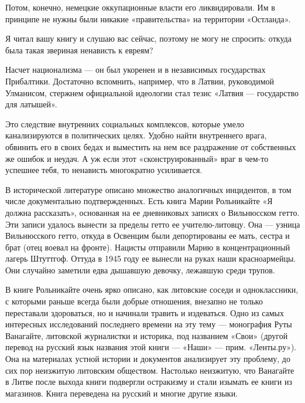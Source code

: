 Потом, конечно, немецкие оккупационные власти его ликвидировали. Им в принципе
не нужны были никакие «правительства» на территории «Остланда».

Я читал вашу книгу и слушаю вас сейчас, поэтому не могу не спросить: откуда
была такая звериная ненависть к евреям?

Насчет национализма — он был укоренен и в независимых государствах Прибалтики.
Достаточно вспомнить, например, что в Латвии, руководимой Улманисом, стержнем
официальной идеологии стал тезис «Латвия — государство для латышей».

Это следствие внутренних социальных комплексов, которые умело канализируются в
политических целях. Удобно найти внутреннего врага, обвинить его в своих бедах
и выместить на нем все раздражение от собственных же ошибок и неудач. А уж если
этот «сконструированный» враг в чем-то успешнее тебя, то ненависть многократно
усиливается.

В исторической литературе описано множество аналогичных инцидентов, в том числе
документально подтвержденных. Есть книга Марии Рольникайте «Я должна
рассказать», основанная на ее дневниковых записях о Вильнюсском гетто. Эти
записи удалось вынести за пределы гетто ее учителю-литовцу. Она — узница
Вильнюсского гетто, откуда в Освенцим были депортированы ее мать, сестра и брат
(отец воевал на фронте). Нацисты отправили Марию в концентрационный лагерь
Штуттгоф. Оттуда в 1945 году ее вынесли на руках наши красноармейцы. Они
случайно заметили едва дышавшую девочку, лежавшую среди трупов.

В книге Рольникайте очень ярко описано, как литовские соседи и одноклассники, с
которыми раньше всегда были добрые отношения, внезапно не только переставали
здороваться, но и начинали травить и издеваться. Одно из самых интересных
исследований последнего времени на эту тему — монография Руты Ванагайте,
литовской журналистки и историка, под названием «Свои» (другой перевод на
русский язык названия этой книги — «Наши» — прим. «Ленты.ру»). Она на
материалах устной истории и документов анализирует эту проблему, до сих пор
неизжитую литовским обществом. Настолько неизжитую, что Ванагайте в Литве после
выхода книги подвергли остракизму и стали изымать ее книги из магазинов. Книга
переведена на русский и многие другие языки.

